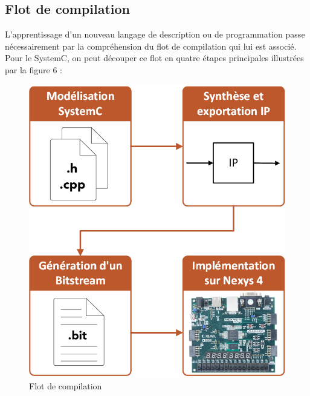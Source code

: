 \documentclass[a4paper,12pt]{article}
\begin{document}
\subsection{Flot de compilation}
L'apprentissage d'un nouveau langage de description ou de programmation passe nécessairement par la compréhension du flot de compilation qui lui est associé. Pour le SystemC, on peut découper ce flot en quatre étapes principales illustrées par la figure 6 :
\begin{figure}[H]
\centering
\includegraphics[scale=0.5, keepaspectratio]{Dessin2.png}
\caption{Flot de compilation}
\end{figure}
\end{document}
